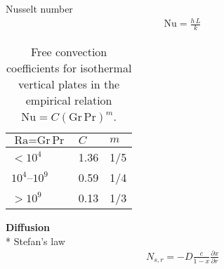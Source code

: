 \documentclass[calculator,datasheet,handbook]{exam}
\begin{document}
\begin{datasheet}
  Nusselt number
  \begin{align*}
    \text{Nu} = \frac{h\,L}{k}
  \end{align*}
  \begin{table}[ht!]
    \begin{center}
      \begin{tabular}{|p{3cm}|p{3cm}|p{3cm}|}\hline
        $\text{Ra}=\text{Gr}\,\text{Pr}$ & $C$ & $m$\\\hline
        $< 10^{4}$ & 1.36 & 1/5\\
        $10^{4}$--$10^{9}$ & 0.59 & 1/4 \\
        $>10^{9}$ & 0.13 & 1/3\\\hline
      \end{tabular}
      \caption{\label{tab:conv}Free convection coefficients for isothermal vertical
        plates in the empirical relation $\text{Nu}=C\left(\text{Gr}\,\text{Pr}\right)^m$.
      }
    \end{center}
  \end{table}

  {\bf Diffusion}\\*
  Stefan's law
  \begin{align*}
    N_{s,r} = -D \frac{c}{1-x}\frac{\partial x}{\partial r}
  \end{align*}
\end{datasheet}

\paperend
\end{document}
